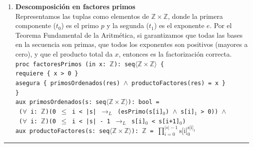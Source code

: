 \begin{enumerate}[label=\textbf{\alph*)}]
    \vspace{0.4cm}
    \item \textbf{Descomposición en factores primos} \\
    Representamos las tuplas como elementos de $\mathbb{Z} \times \mathbb{Z}$, donde la primera componente ($t_0$) es el primo $p$ y la segunda ($t_1$) es el exponente $e$. Por el Teorema Fundamental de la Aritmética, si garantizamos que todas las bases en la secuencia son primas, que todos los exponentes son positivos (mayores a cero), y que el producto total da $x$, entonces es la factorización correcta. \\
    \newpage
    \texttt{proc factoresPrimos (in x: $\mathbb{Z}$): seq$\langle\mathbb{Z} \times \mathbb{Z}\rangle$ \{} \\
    \texttt{\hspace*{0.5cm}requiere \{ x > 0 \}} \\
    \texttt{\hspace*{0.5cm}asegura \{ primosOrdenados(res) $\wedge$ productoFactores(res) = x \}} \\
    \texttt{\}} \\
    
    \texttt{aux primosOrdenados(s: seq$\langle\mathbb{Z} \times \mathbb{Z}\rangle$): bool =} \\
    \texttt{\hspace*{0.5cm} ($\forall$ i: $\mathbb{Z}$)(0 $\leq$ i < |s| $\rightarrow_L$ (esPrimo(s[i]$_0$) $\wedge$ s[i]$_1$ > 0)) $\wedge$} \\
    \texttt{\hspace*{0.5cm} ($\forall$ i: $\mathbb{Z}$)(0 $\leq$ i < |s| - 1 $\rightarrow_L$ s[i]$_0$ < s[i+1]$_0$)} \\
    
    \texttt{aux productoFactores(s: seq$\langle\mathbb{Z} \times \mathbb{Z}\rangle$): $\mathbb{Z}$ = $\prod_{i=0}^{|s|-1} \text{s[i]}_0^{\text{s[i]}_1}$}

\end{enumerate}

\vspace{0.5cm}
\hrule
\vspace{0.5cm}